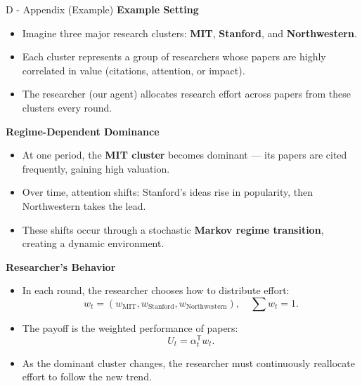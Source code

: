 \documentclass{beamer}
\begin{document}
\begin{frame}{D - Appendix (Example)}
\scriptsize
\textbf{Example Setting}
    \begin{itemize}
        \item Imagine three major research clusters:
              \textbf{MIT}, \textbf{Stanford}, and \textbf{Northwestern}.
        \item Each cluster represents a group of researchers 
              whose papers are highly correlated in value (citations, attention, or impact).
        \item The researcher (our agent) allocates research effort
              across papers from these clusters every round.
    \end{itemize}
\textbf{Regime-Dependent Dominance}
\begin{itemize}
        \item At one period, the \textbf{MIT cluster} becomes dominant 
              --- its papers are cited frequently, gaining high valuation.
        \item Over time, attention shifts:
              Stanford’s ideas rise in popularity,
              then Northwestern takes the lead.
        \item These shifts occur through a stochastic 
              \textbf{Markov regime transition}, 
              creating a dynamic environment.
    \end{itemize}
\textbf{Researcher’s Behavior}
\begin{itemize}
        \item In each round, the researcher chooses how to distribute effort:
              \[
              w_t = (w_{\text{MIT}}, w_{\text{Stanford}}, w_{\text{Northwestern}}),
              \quad \sum w_t = 1.
              \]
        \item The payoff is the weighted performance of papers:
              \[
              U_t = \alpha_t^{\mathsf{T}} w_t.
              \]
        \item As the dominant cluster changes, the researcher must 
              continuously reallocate effort to follow the new trend.
\end{itemize}
\end{frame}
\end{document}
